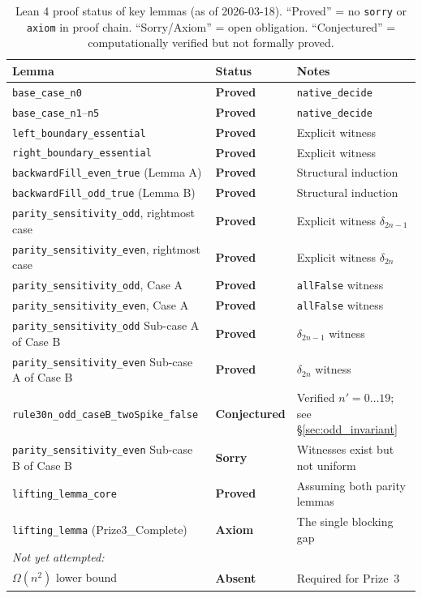\documentclass[11pt]{article}
\begin{document}
\begin{table}[t]
\centering
\caption{Lean 4 proof status of key lemmas (as of 2026-03-18). ``Proved'' = no \texttt{sorry} or \texttt{axiom} in proof chain. ``Sorry/Axiom'' = open obligation. ``Conjectured'' = computationally verified but not formally proved.}
\label{tab:proof_status}
\begin{tabular}{@{}lll@{}}
\toprule
Lemma & Status & Notes \\
\midrule
\texttt{base\_case\_n0} & \textbf{Proved} & \texttt{native\_decide} \\
\texttt{base\_case\_n1}--\texttt{n5} & \textbf{Proved} & \texttt{native\_decide} \\
\texttt{left\_boundary\_essential} & \textbf{Proved} & Explicit witness \\
\texttt{right\_boundary\_essential} & \textbf{Proved} & Explicit witness \\
\texttt{backwardFill\_even\_true} (Lemma A) & \textbf{Proved} & Structural induction \\
\texttt{backwardFill\_odd\_true} (Lemma B) & \textbf{Proved} & Structural induction \\
\texttt{parity\_sensitivity\_odd}, rightmost case & \textbf{Proved} & Explicit witness $\delta_{2n-1}$ \\
\texttt{parity\_sensitivity\_even}, rightmost case & \textbf{Proved} & Explicit witness $\delta_{2n}$ \\
\texttt{parity\_sensitivity\_odd}, Case A & \textbf{Proved} & \texttt{allFalse} witness \\
\texttt{parity\_sensitivity\_even}, Case A & \textbf{Proved} & \texttt{allFalse} witness \\
\texttt{parity\_sensitivity\_odd} Sub-case A of Case B & \textbf{Proved} & $\delta_{2n-1}$ witness \\
\texttt{parity\_sensitivity\_even} Sub-case A of Case B & \textbf{Proved} & $\delta_{2n}$ witness \\
\texttt{rule30n\_odd\_caseB\_twoSpike\_false} & \textbf{Conjectured} & Verified $n' = 0\ldots19$; see \S\ref{sec:odd_invariant} \\
\texttt{parity\_sensitivity\_even} Sub-case B of Case B & \textbf{Sorry} & Witnesses exist but not uniform \\
\texttt{lifting\_lemma\_core} & \textbf{Proved} & Assuming both parity lemmas \\
\texttt{lifting\_lemma} (Prize3\_Complete) & \textbf{Axiom} & The single blocking gap \\
\midrule
\multicolumn{3}{l}{\textit{Not yet attempted:}} \\
$\Omega(n^2)$ lower bound & \textbf{Absent} & Required for Prize~3 \\
\bottomrule
\end{tabular}
\end{table}
\end{document}
